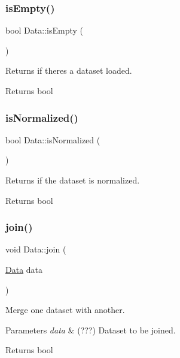 \subsubsection{\texorpdfstring{is\+Empty()}{isEmpty()}}
{\footnotesize\ttfamily bool Data\+::is\+Empty (\begin{DoxyParamCaption}{ }\end{DoxyParamCaption})}



Returns if there\textquotesingle{}s a dataset loaded. 

\begin{DoxyReturn}{Returns}
bool 
\end{DoxyReturn}
\mbox{\label{class_data_ad96fc8e9c5ec9e40b1dc6d9670eefe0c}} 
\subsubsection{\texorpdfstring{is\+Normalized()}{isNormalized()}}
{\footnotesize\ttfamily bool Data\+::is\+Normalized (\begin{DoxyParamCaption}{ }\end{DoxyParamCaption})}



Returns if the dataset is normalized. 

\begin{DoxyReturn}{Returns}
bool 
\end{DoxyReturn}
\mbox{\label{class_data_a83c2a01ded98c4fad0b5b31538039046}} 
\subsubsection{\texorpdfstring{join()}{join()}}
{\footnotesize\ttfamily void Data\+::join (\begin{DoxyParamCaption}\item[{\hyperlink{class_data}{Data}}]{data }\end{DoxyParamCaption})}



Merge one dataset with another. 


\begin{DoxyParams}{Parameters}
{\em data} & (???) Dataset to be joined. \\
\hline
\end{DoxyParams}
\begin{DoxyReturn}{Returns}
bool 
\end{DoxyReturn}
\mbox{\label{class_data_ac2ed251251be234c607f486e16902112}} 
